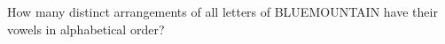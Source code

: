 How many distinct arrangements of all letters of BLUEMOUNTAIN have their vowels in alphabetical order?
